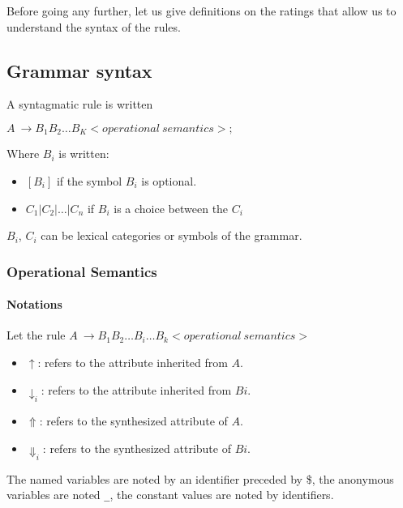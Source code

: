 \documentclass[11pt]{article}
\begin{document}
Before going any further, let us give definitions on the ratings that
  allow us to understand the syntax of the rules.
  
\subsection*{Grammar syntax}
 
A syntagmatic rule is written 

$A~ \rightarrow B_1 B_2 \dots B_K <operational~semantics>;$
 
Where $B_i$ is written:

\begin{itemize}
\item $[ B_i ]$ if the symbol $B_i$ is optional.
\item $C_1 | C_2 | \dots | C_n$ if $B_i$ is a choice between the $C_i$
\end{itemize}
 
$B_i$, $C_i$ can be lexical categories or symbols of the
grammar.

\subsubsection*{Operational Semantics}

\paragraph{Notations}

Let the rule
$A~ \rightarrow B_1 B_2 \dots B_i \dots B_k <operational~semantics>$

\begin{itemize}
\item $\uparrow$: refers to the attribute inherited from $A$.
\item $\downarrow_i$: refers to the attribute inherited from $Bi$.
\item $\Uparrow$: refers to the synthesized attribute of $A$.
\item $\Downarrow_i$: refers to the synthesized attribute of $Bi$. 
\end{itemize}

The named variables are noted by an identifier preceded by \og
\$\fg{}, the anonymous variables are noted \og \verb#_#\fg{}, the
constant values are noted by identifiers.
\end{document}
